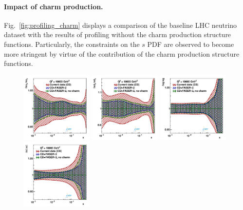 \paragraph{Impact of charm production.}
%
Fig.~\ref{fig:profiling_charm} displays a comparison of the baseline LHC neutrino dataset with the results
of profiling without the charm production structure functions. 
Particularly, the constraints on the $s$ PDF are observed to become more stringent 
by virtue of the contribution of the charm production structure functions.
\begin{figure}[t]
\centering
\includegraphics[width=0.32\textwidth]{plots/proton_fasernu2/inclusive-only_vs_inclusive+charm/statOnly_FASERv2_q2_10000_pdf_uv_ratio.pdf}
\includegraphics[width=0.32\textwidth]{plots/proton_fasernu2/inclusive-only_vs_inclusive+charm/statOnly_FASERv2_q2_10000_pdf_dv_ratio.pdf}
\includegraphics[width=0.32\textwidth]{plots/proton_fasernu2/inclusive-only_vs_inclusive+charm/statOnly_FASERv2_q2_10000_pdf_g_ratio.pdf}\\
\includegraphics[width=0.32\textwidth]{plots/proton_fasernu2/inclusive-only_vs_inclusive+charm/statOnly_FASERv2_q2_10000_pdf_Sea_ratio.pdf}

\end{figure}
